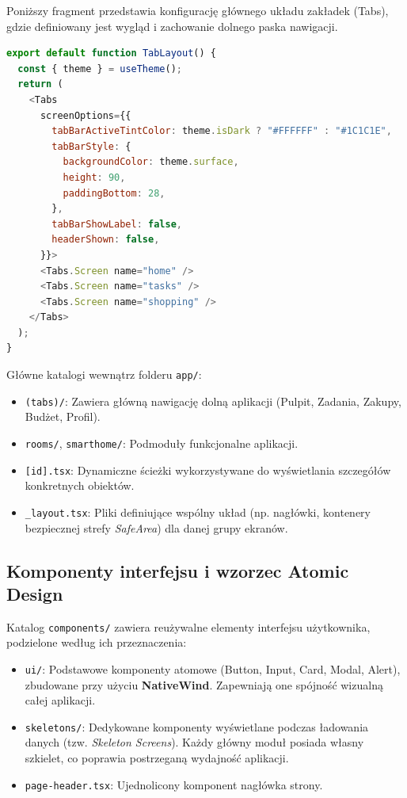 Poniższy fragment przedstawia konfigurację głównego układu zakładek (Tabs), gdzie definiowany jest wygląd i zachowanie dolnego paska nawigacji.

\begin{lstlisting}[language=javascript, caption=Definicja układu nawigacji w Expo Router, label=code:frontend_routing]
export default function TabLayout() {
  const { theme } = useTheme();
  return (
    <Tabs
      screenOptions={{
        tabBarActiveTintColor: theme.isDark ? "#FFFFFF" : "#1C1C1E",
        tabBarStyle: {
          backgroundColor: theme.surface,
          height: 90,
          paddingBottom: 28,
        },
        tabBarShowLabel: false,
        headerShown: false,
      }}>
      <Tabs.Screen name="home" />
      <Tabs.Screen name="tasks" />
      <Tabs.Screen name="shopping" />
    </Tabs>
  );
}
\end{lstlisting}

Główne katalogi wewnątrz folderu \texttt{app/}:
\begin{itemize}
    \item \texttt{(tabs)/}: Zawiera główną nawigację dolną aplikacji (Pulpit, Zadania, Zakupy, Budżet, Profil).
    \item \texttt{rooms/}, \texttt{smarthome/}: Podmoduły funkcjonalne aplikacji.
    \item \texttt{[id].tsx}: Dynamiczne ścieżki wykorzystywane do wyświetlania szczegółów konkretnych obiektów.
    \item \texttt{\_layout.tsx}: Pliki definiujące wspólny układ (np. nagłówki, kontenery bezpiecznej strefy \textit{SafeArea}) dla danej grupy ekranów.
\end{itemize}

\subsection{Komponenty interfejsu i wzorzec Atomic Design}
Katalog \texttt{components/} zawiera reużywalne elementy interfejsu użytkownika, podzielone według ich przeznaczenia:
\begin{itemize}
    \item \texttt{ui/}: Podstawowe komponenty atomowe (Button, Input, Card, Modal, Alert), zbudowane przy użyciu \textbf{NativeWind}. Zapewniają one spójność wizualną całej aplikacji.
    \item \texttt{skeletons/}: Dedykowane komponenty wyświetlane podczas ładowania danych (tzw. \textit{Skeleton Screens}). Każdy główny moduł posiada własny szkielet, co poprawia postrzeganą wydajność aplikacji.
    \item \texttt{page-header.tsx}: Ujednolicony komponent nagłówka strony.
\end{itemize}

